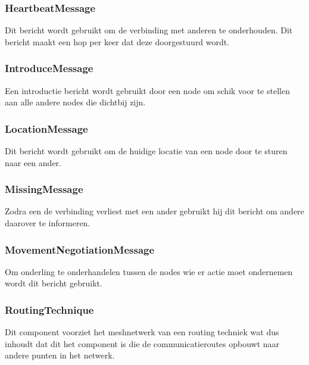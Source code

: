 \documentclass[a4paper, 11pt, oneside]{report}
\begin{document}
\subsubsection{HeartbeatMessage}
\label{architectural:subcomponenten:HeartbeatMessage}
Dit bericht wordt gebruikt om de verbinding met anderen te onderhouden. Dit bericht maakt een hop per keer dat deze doorgestuurd wordt.

\subsubsection{IntroduceMessage}
\label{architectural:subcomponenten:IntroduceMessage}
Een introductie bericht wordt gebruikt door een node om schik voor te stellen aan alle andere nodes die dichtbij zijn. 

\subsubsection{LocationMessage}
\label{architectural:subcomponenten:LocationMessage}
Dit bericht wordt gebruikt om de huidige locatie van een node door te sturen naar een ander.

\subsubsection{MissingMessage}
\label{architectural:subcomponenten:MissingMessage}
Zodra een  de verbinding verliest met een ander gebruikt hij dit bericht om andere daarover te informeren.

\subsubsection{MovementNegotiationMessage}	
\label{architectural:subcomponenten:MovementNegotiationMessage}
Om onderling te onderhandelen tussen de nodes wie er actie moet ondernemen wordt dit bericht gebruikt.

\subsubsection{RoutingTechnique}
\label{architectural:subcomponenten:RoutingTechnique}
Dit component voorziet het meshnetwerk van een routing techniek wat dus inhoudt dat dit het component is die de communicatieroutes opbouwt naar andere punten in het netwerk.
\end{document}
